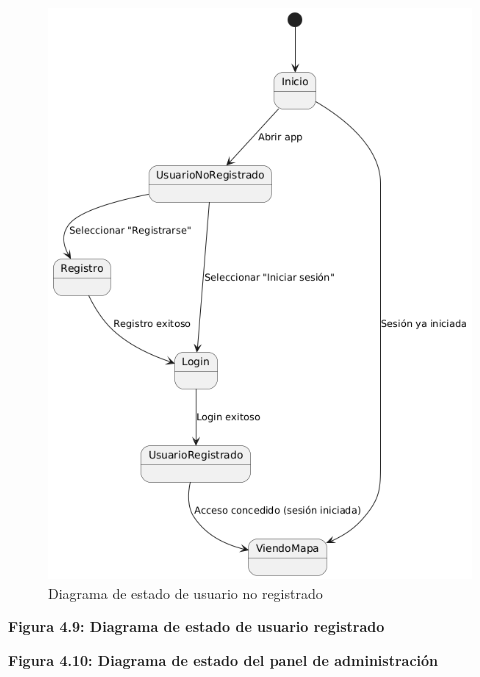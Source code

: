 \begin{figure}[H]
    \centering
    \includegraphics[width=1\textwidth]{figs/estado_usuario_no_registrado.png}
    \caption{Diagrama de estado de usuario no registrado}
\end{figure}

\begin{landscape}
    \vfill
    \centering
    \par\vspace{1ex}
    \textbf{Figura 4.9: Diagrama de estado de usuario registrado}
    \vfill
\end{landscape}


\begin{landscape}
    \vfill
    \centering
    \par\vspace{1ex}
    \textbf{Figura 4.10: Diagrama de estado del panel de administración}
    \vfill
\end{landscape}